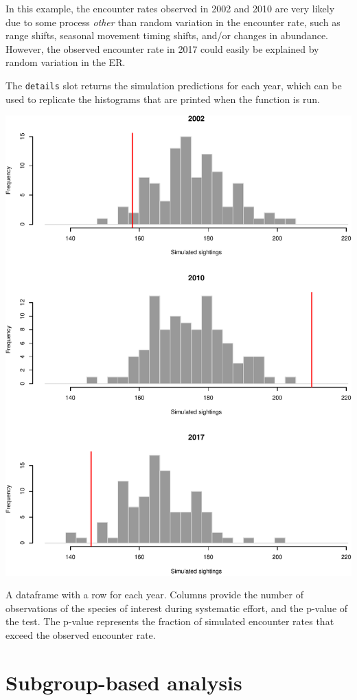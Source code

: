 \documentclass[
]{book}
\begin{document}
In this example, the encounter rates observed in 2002 and 2010 are very likely due to some process \emph{other} than random variation in the encounter rate, such as range shifts, seasonal movement timing shifts, and/or changes in abundance. However, the observed encounter rate in 2017 could easily be explained by random variation in the ER.

The \texttt{details} slot returns the simulation predictions for each year, which can be used to replicate the histograms that are printed when the function is run.

\includegraphics{figures/unnamed-chunk-273-1.pdf}

A dataframe with a row for each year. Columns provide the number of observations of the species of interest during systematic effort, and the p-value of the test. The p-value represents the fraction of simulated encounter rates that exceed the observed encounter rate.

\hypertarget{subgroup-based-analysis}{%
\chapter{Subgroup-based analysis}\label{subgroup-based-analysis}}
\end{document}
